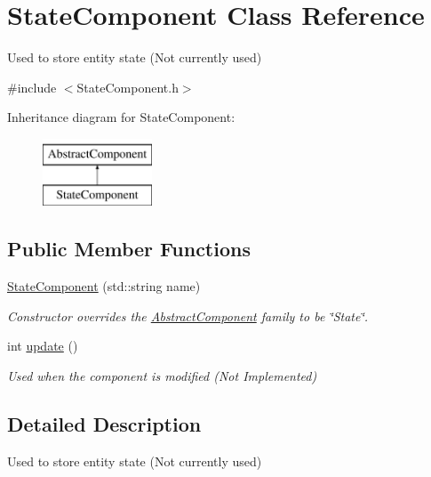 \hypertarget{class_state_component}{\section{State\-Component Class Reference}
\label{d0/d07/class_state_component}
}


Used to store entity state (Not currently used)  




{\ttfamily \#include $<$State\-Component.\-h$>$}

Inheritance diagram for State\-Component\-:\begin{figure}[H]
\begin{center}
\leavevmode
\includegraphics[height=2.000000cm]{d0/d07/class_state_component}
\end{center}
\end{figure}
\subsection*{Public Member Functions}
\begin{DoxyCompactItemize}
\item 
\hyperlink{class_state_component_a5b6986079c4a998d5313d7f8d8c4e053}{State\-Component} (std\-::string name)
\begin{DoxyCompactList}\small\item\em Constructor overrides the \hyperlink{class_abstract_component}{Abstract\-Component} family to be \char`\"{}\-State\char`\"{}. \end{DoxyCompactList}\item 
int \hyperlink{class_state_component_a202841453e2d2bebc43079ec2da344bb}{update} ()
\begin{DoxyCompactList}\small\item\em Used when the component is modified (Not Implemented) \end{DoxyCompactList}\end{DoxyCompactItemize}


\subsection{Detailed Description}
Used to store entity state (Not currently used) 

